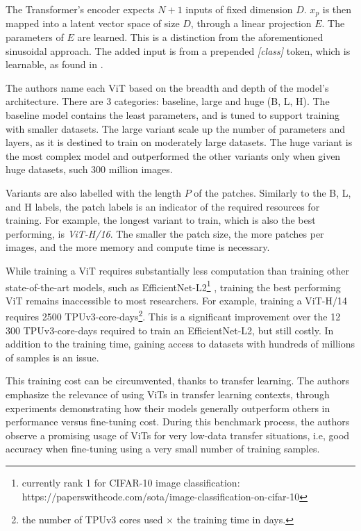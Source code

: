 \documentclass[a4paper,11pt]{article}
\begin{document}
The Transformer's encoder expects $N+1$ inputs of fixed dimension $D$. $x_p$ is then mapped into a latent vector space of size $D$, through a linear projection $E$. The parameters of $E$ are learned. This is a distinction from the aforementioned sinusoidal approach. The added input is from a prepended \textit{[class]} token, which is learnable, as found in \cite{devlin2019bert}.

The authors name each ViT based on the breadth and depth of the model's architecture. There are 3 categories: baseline, large and huge (B, L, H). The baseline model contains the least parameters, and is tuned to support training with smaller datasets. The large variant scale up the number of parameters and layers, as it is destined to train on moderately large datasets. The huge variant is the most complex model and outperformed the other variants only when given huge datasets, such 300 million images.

Variants are also labelled with the length $P$ of the patches. Similarly to the B, L, and H labels, the patch labels is an indicator of the required resources for training. For example, the longest variant to train, which is also the best performing, is \textit{ViT-H/16}. The smaller the patch size, the more patches per images, and the more memory and compute time is necessary.

While training a ViT requires substantially less computation than training other state-of-the-art models, such as EfficientNet-L2\footnote{currently rank 1 for CIFAR-10 image classification: https://paperswithcode.com/sota/image-classification-on-cifar-10} \cite{xie2020selftraining}, training the best performing ViT remains inaccessible to most researchers. For example, training a ViT-H/14 requires 2500 TPUv3-core-days\footnote{the number of TPUv3 cores used $\times$ the training time in days.}. This is a significant improvement over the 12 300 TPUv3-core-days required to train an EfficientNet-L2, but still costly. In addition to the training time, gaining access to datasets with hundreds of millions of samples is an issue.

This training cost can be circumvented, thanks to transfer learning. The authors emphasize the relevance of using ViTs in transfer learning contexts, through experiments demonstrating how their models generally outperform others in performance versus fine-tuning cost. During this benchmark process, the authors observe a promising usage of ViTs for very low-data transfer situations, i.e, good accuracy when fine-tuning using a very small number of training samples. 
\end{document}
